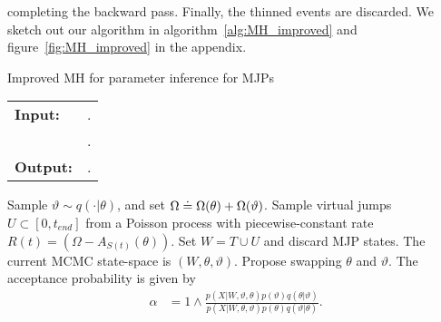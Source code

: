    completing the backward pass. Finally, the thinned events are
   discarded. We sketch out our algorithm in algorithm~\ref{alg:MH_improved}
   and figure~\ref{fig:MH_improved} in the appendix. 
\begin{algorithm}[H]
   \caption{Improved MH for parameter inference for MJPs }
   \label{alg:MH_improved}
  \begin{tabular}{l l}
   \textbf{Input:  } & \text{The observations $X$,}
                      \text{the previous MJP path $S(t) = (S, T)$ and parameters $\theta$ }.\\ 
                     & \text{A  Metropolis-Hasting proposal $q(\cdot | \theta)$}.\\
   \textbf{Output:  }& \text{A new MJP trajectory $S'(t) = (S', T')$, 
                            new MJP parameters $\theta'$}.\\
   \hline
   \end{tabular}
   \begin{algorithmic}[1]
      \State Sample $\vartheta \sim q(\cdot| \theta)$, and 
      set %
	$\Omega \doteq \Omega(\theta) + \Omega(\vartheta)$.
    \State Sample virtual jumps $U\subset[0, t_{end}]$ from a Poisson process with 
    piecewise-constant rate $R(t) = (\Omega - A_{S(t)}(\theta))$. 
    Set $W = T \cup U$ and discard MJP states.
    \State The current MCMC state-space is $(W,\theta,\vartheta)$. Propose swapping
    $\theta$ and $\vartheta$. %
     The acceptance probability is given by
     \vspace{-.15in}
        \begin{align*}
        \alpha %
        &=  1 \wedge \frac{p(X| W,\vartheta,\theta)p(\vartheta)q(\theta|\vartheta)}
        {p(X| W,\theta, \vartheta)p(\theta) q(\vartheta|\theta)}.

\end{align*}
\end{algorithmic}
\end{algorithm}
